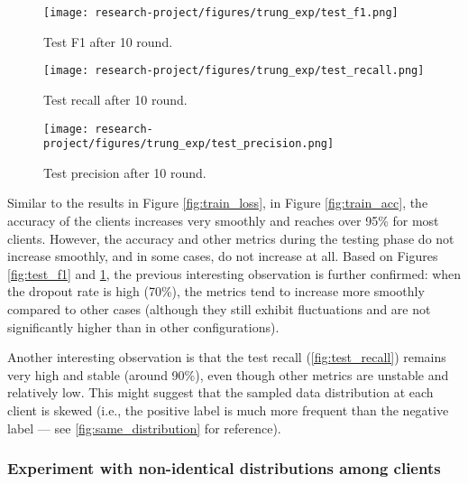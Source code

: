 \documentclass[12pt, a4paper]{article}
\begin{document}
\begin{figure}[H]
    \centering
    \begin{minipage}[b]{0.3\textwidth}
        \centering
        \texttt{[image: research-project/figures/trung\_exp/test\_f1.png]}
        \caption{Test F1 after 10 round.}
        \label{fig:test_f1}
    \end{minipage}
    \hfill
    \begin{minipage}[b]{0.3\textwidth}
        \centering
        \texttt{[image: research-project/figures/trung\_exp/test\_recall.png]}
        \caption{Test recall after 10 round.}
        \label{fig:test_recall}
    \end{minipage}
    \hfill 
    \begin{minipage}[b]{0.3\textwidth}
        \centering
        \texttt{[image: research-project/figures/trung\_exp/test\_precision.png]}
        \caption{Test precision after 10 round.}
        \label{fig:test_precision}
    \end{minipage}
    
\end{figure}

Similar to the results in Figure \ref{fig:train_loss}, in Figure \ref{fig:train_acc}, the accuracy of the clients increases very smoothly and reaches over 95\% for most clients. However, the accuracy and other metrics during the testing phase do not increase smoothly, and in some cases, do not increase at all. Based on Figures \ref{fig:test_f1} and \ref{fig:test_precision}, the previous interesting observation is further confirmed: when the dropout rate is high (70\%), the metrics tend to increase more smoothly compared to other cases (although they still exhibit fluctuations and are not significantly higher than in other configurations).

Another interesting observation is that the test recall (\ref{fig:test_recall}) remains very high and stable (around 90\%), even though other metrics are unstable and relatively low. This might suggest that the sampled data distribution at each client is skewed (i.e., the positive label is much more frequent than the negative label — see \ref{fig:same_distribution} for reference).

\subsubsection{Experiment with non-identical distributions among clients}
\end{document}
